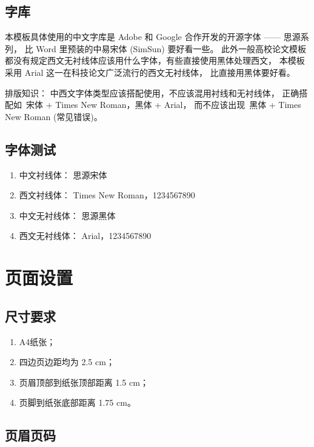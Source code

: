 \documentclass{swputhesis}
\begin{document}
\subsection{字库}

本模板具体使用的中文字库是 Adobe 和 Google 合作开发的开源字体 —— 思源系列，
比 Word 里预装的中易宋体 (SimSun) 要好看一些。
此外一般高校论文模板都没有规定西文无衬线体应该用什么字体，有些直接使用黑体处理西文，
本模板采用 Arial 这一在科技论文广泛流行的西文无衬线体，
比直接用黑体要好看。

\textsf{排版知识：} 中西文字体类型应该搭配使用，不应该混用衬线和无衬线体，
正确搭配如~宋体 + Times New Roman，黑体 + Arial，
而不应该出现~黑体 + Times New Roman (常见错误)。

\subsection{字体测试}

\begin{enumerate}
	\item 中文衬线体： 思源宋体
	\item 西文衬线体： Times New Roman，1234567890
	\item 中文无衬线体： \textsf{思源黑体}
	\item 西文无衬线体： \textsf{Arial，1234567890}
\end{enumerate}

\section{页面设置}

\subsection{尺寸要求}

\begin{enumerate}
	\item A4纸张；
	\item 四边页边距均为 2.5 cm；
	\item 页眉顶部到纸张顶部距离 1.5 cm；
	\item 页脚到纸张底部距离 1.75 cm。
\end{enumerate}

\subsection{页眉页码}
\end{document}

